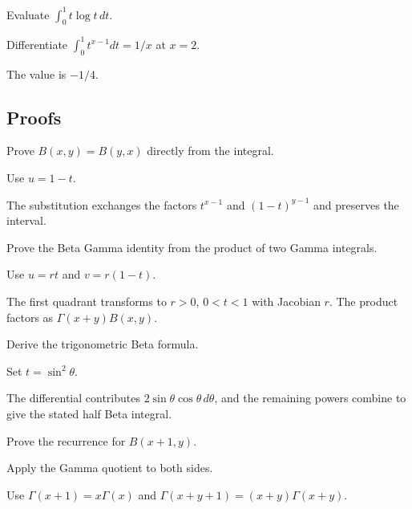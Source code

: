 \begin{exercise}\label{exr:iv20-expand-05}
Evaluate \(\int_0^1 t\log t\,dt\).
\end{exercise}
\begin{hint}
Differentiate \(\int_0^1 t^{x-1}dt=1/x\) at \(x=2\).
\end{hint}
\begin{solution}
The value is \(-1/4\).
\end{solution}

\subsection*{Proofs}

\begin{exercise}\label{exr:iv20-expand-06}
Prove \(B(x,y)=B(y,x)\) directly from the integral.
\end{exercise}
\begin{hint}
Use \(u=1-t\).
\end{hint}
\begin{solution}
The substitution exchanges the factors \(t^{x-1}\) and \((1-t)^{y-1}\) and preserves the interval.
\end{solution}

\begin{exercise}\label{exr:iv20-expand-07}
Prove the Beta Gamma identity from the product of two Gamma integrals.
\end{exercise}
\begin{hint}
Use \(u=rt\) and \(v=r(1-t)\).
\end{hint}
\begin{solution}
The first quadrant transforms to \(r>0\), \(0<t<1\) with Jacobian \(r\). The product factors as \(\Gamma(x+y)B(x,y)\).
\end{solution}

\begin{exercise}\label{exr:iv20-expand-08}
Derive the trigonometric Beta formula.
\end{exercise}
\begin{hint}
Set \(t=\sin^2\theta\).
\end{hint}
\begin{solution}
The differential contributes \(2\sin\theta\cos\theta\,d\theta\), and the remaining powers combine to give the stated half Beta integral.
\end{solution}

\begin{exercise}\label{exr:iv20-expand-09}
Prove the recurrence for \(B(x+1,y)\).
\end{exercise}
\begin{hint}
Apply the Gamma quotient to both sides.
\end{hint}
\begin{solution}
Use \(\Gamma(x+1)=x\Gamma(x)\) and \(\Gamma(x+y+1)=(x+y)\Gamma(x+y)\).
\end{solution}

